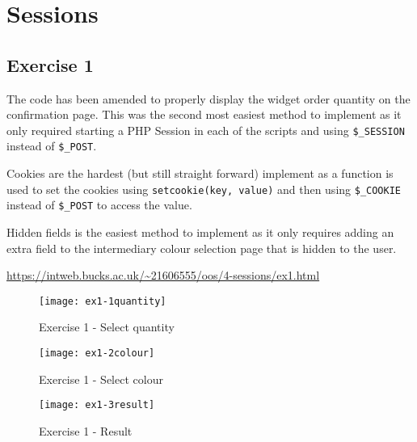 \chapter{Sessions}
\graphicspath{{4-sessions/images/}}

\section{Exercise 1}

The code has been amended to properly display the widget order quantity on the confirmation page. This was the second most easiest method to implement as it only required starting a PHP Session in each of the scripts and using \texttt{\$\_SESSION} instead of \texttt{\$\_POST}.

Cookies are the hardest (but still straight forward) implement as a function is used to set the cookies using \texttt{setcookie(key, value)} and then using \texttt{\$\_COOKIE} instead of \texttt{\$\_POST} to access the value.

Hidden fields is the easiest method to implement as it only requires adding an extra field to the intermediary colour selection page that is hidden to the user.

\url{https://intweb.bucks.ac.uk/~21606555/oos/4-sessions/ex1.html}

\clearpage
\captionsetup{type=figure}


\captionsetup{type=figure}


\captionsetup{type=figure}


\begin{figure}[H]
  \caption{Exercise 1 - Select quantity}
  \centering
  \texttt{[image: ex1-1quantity]}
\end{figure}

\begin{figure}[H]
  \caption{Exercise 1 - Select colour}
  \centering
  \texttt{[image: ex1-2colour]}
\end{figure}

\begin{figure}[H]
  \caption{Exercise 1 - Result}
  \centering
  \texttt{[image: ex1-3result]}
\end{figure}

